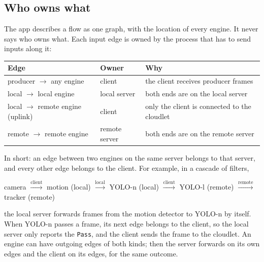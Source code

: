 \documentclass[11pt]{article}
\newcommand{\code}[1]{\texttt{#1}}
\begin{document}
\subsection{Who owns what}
\label{sec:ownership}

The app describes a flow as one graph, with the location of every engine. It
never says who owns what. Each input edge is owned by the process that has to
send inputs along it:

\begin{center}
\small
\begin{tabular}{@{}lll@{}}
\toprule
Edge & Owner & Why \\
\midrule
producer $\to$ any engine & client & the client receives producer frames \\
local $\to$ local engine & local server & both ends are on the local server \\
local $\to$ remote engine (uplink) & client & only the client is connected to the cloudlet \\
remote $\to$ remote engine & remote server & both ends are on the remote server \\
\bottomrule
\end{tabular}
\end{center}

In short: an edge between two engines on the same server belongs to that
server, and every other edge belongs to the client. For example, in a cascade
of filters,
\begin{center}
camera $\xrightarrow{\text{client}}$ motion (local)
$\xrightarrow{\text{local}}$ YOLO-n (local)
$\xrightarrow{\text{client}}$ YOLO-l (remote)
$\xrightarrow{\text{remote}}$ tracker (remote)
\end{center}
the local server forwards frames from the motion detector to YOLO-n by itself.
When YOLO-n passes a frame, its next edge belongs to the client, so the local
server only reports the \code{Pass}, and the client sends the frame to the
cloudlet. An engine can have outgoing edges of both kinds; then the server
forwards on its own edges and the client on its edges, for the same outcome.
\end{document}

